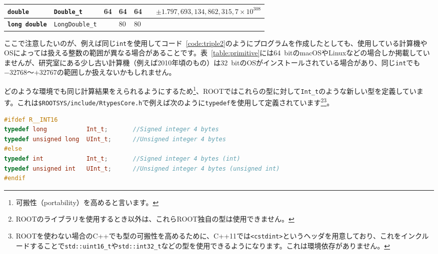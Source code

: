 \begin{landscape}
\begin{table}
\begin{tabular}{|l|l|l|l|l|l|l|}
\textbf{\texttt{double}}            & \texttt{Double\_t}                   & 64                       & 64                  & 64                  &                                                   & $\pm1.797,693,134,862,315,7 \times 10^{308}$                                                                                           \\ \hline
\textbf{\texttt{long double}}       & \texttt{LongDouble\_t}               &                          & 80                  & 80                  &                                                   &                                                                                                                             \\ \hline
\end{tabular}
\normalsize
\end{table}
\end{landscape}

ここで注意したいのが、例えば同じ\texttt{int}を使用してコード~\ref{code:triple2}のようにプログラムを作成したとしても、使用している計算機やOSによっては扱える整数の範囲が異なる場合があることです。表~\ref{table:primitive}には64~bitのmacOSやLinuxなどの場合しか掲載していませんが、研究室にある少し古い計算機（例えば2010年頃のもの）は32~bitのOSがインストールされている場合があり、同じ\texttt{int}でも$-32768$〜$+32767$の範囲しか扱えないかもしれません。

どのような環境でも同じ計算結果をえられるようにするため\footnote{可搬性（portability）を高めると言います。}、ROOTではこれらの型に対して\texttt{Int\_t}のような新しい型を定義しています。これは\texttt{\$ROOTSYS/include/RtypesCore.h}で例えば次のように\texttt{typedef}を使用して定義されています\footnote{ROOTのライブラリを使用するとき以外は、これらROOT独自の型は使用できません。}\footnote{ROOTを使わない場合のC++でも型の可搬性を高めるために、C++11では\texttt{<cstdint>}というヘッダを用意しており、これをインクルードすることで\texttt{std::uint16\_t}や\texttt{std::int32\_t}などの型を使用できるようになります。これは環境依存がありません。}。
\begin{lstlisting}[language=c++]
#ifdef R__INT16
typedef long           Int_t;       //Signed integer 4 bytes
typedef unsigned long  UInt_t;      //Unsigned integer 4 bytes
#else
typedef int            Int_t;       //Signed integer 4 bytes (int)
typedef unsigned int   UInt_t;      //Unsigned integer 4 bytes (unsigned int)
#endif
\end{lstlisting}

